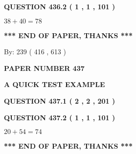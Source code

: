 \documentclass[12pt]{article}
\begin{document}
  
  
\vspace{0.2in}
  
{\textbf{\Large{QUESTION
436.2 
 ( 1 , 1 , 101 )
}}}
  
  
 
 

$ %
38 +  %
40=   %
78$
 
 
   
   
 \vspace{0.2in}
 
   
   
   
   
\vspace{1.0in} 
{\textbf{\large{ *** END OF PAPER, THANKS *** }}} 
   
   
\hspace{1.0in} By: 
 239 ( 416 ,  613 )
   
   
   
   
\newpage 
\setcounter{page}{ 
   437001 } 
   
   
   
   
 {\textbf{ \Large{ PAPER NUMBER  437  }}}
   
   
\vspace{0.2in}
   
   
   
   
   
   
 \vspace{0.2in}
{\LARGE {\textbf{ A QUICK TEST EXAMPLE}}}
   
   
  
\vspace{0.2in}
  
{\textbf{\Large{QUESTION
437.1 
 ( 2 , 2 , 201 )
}}}
  
  
  
\vspace{0.2in}
  
{\textbf{\Large{QUESTION
437.2 
 ( 1 , 1 , 101 )
}}}
  
  
 
 

$ %
20 +  %
54=   %
74$
 
 
   
   
 \vspace{0.2in}
 
   
   
   
   
\vspace{1.0in} 
{\textbf{\large{ *** END OF PAPER, THANKS *** }}} 
   
\end{document}
